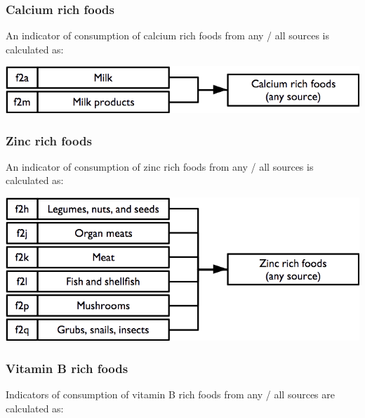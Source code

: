 \documentclass[12pt,a4paper]{book}
\theoremstyle{definition}
\theoremstyle{definition}
\theoremstyle{definition}
\theoremstyle{remark}
\begin{document}
\hypertarget{calcium-rich-foods}{%
\subsubsection{Calcium rich foods}\label{calcium-rich-foods}}

An indicator of consumption of calcium rich foods from any / all sources
is calculated as:

\begin{center}\includegraphics{figures/indicators12} \end{center}

\hypertarget{zinc-rich-foods}{%
\subsubsection{Zinc rich foods}\label{zinc-rich-foods}}

An indicator of consumption of zinc rich foods from any / all sources is
calculated as:

\begin{center}\includegraphics{figures/indicators13} \end{center}

\newpage

\hypertarget{vitamin-b-rich-foods}{%
\subsubsection{Vitamin B rich foods}\label{vitamin-b-rich-foods}}

Indicators of consumption of vitamin B rich foods from any / all sources
are calculated as:
\end{document}

